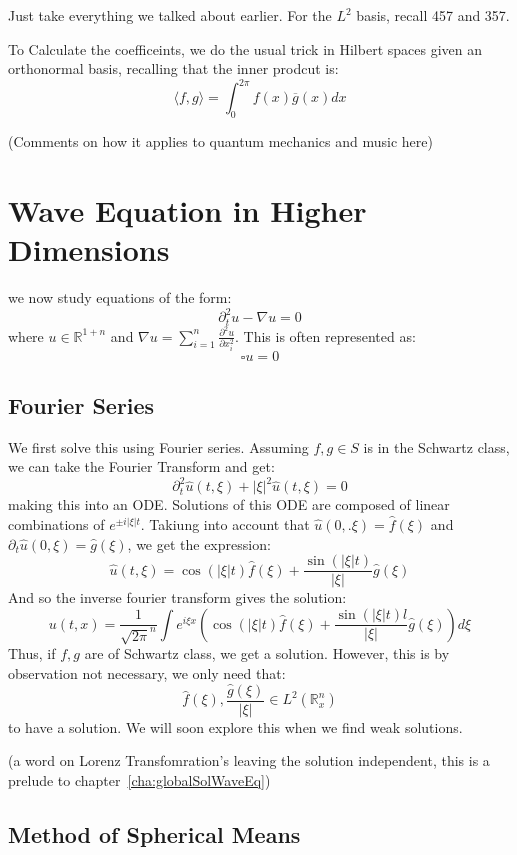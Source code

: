 \documentclass{book}
\newenvironment{Proof}[1][]
  {\begin{ProofTcb}[#1]}
  {\end{ProofTcb}}
\newcommand{\R}{{\mathbb{R}}}
\newcommand{\oln}[1]{{\overline{#1}}}
\begin{document}
\begin{Proof}
	Just take everything we talked about earlier. For the $L^2$ basis, recall 457 and 357.
\end{Proof}

To Calculate the coefficeints, we do the usual trick in Hilbert spaces given an orthonormal basis, recalling that the
inner prodcut is:
\[
	\langle f,g\rangle = \int_{0}^{2\pi} f(x) \oln{g}(x)dx
\]

(Comments on how it applies to quantum mechanics and music here)

\section{Wave Equation in Higher Dimensions}

we now study equations of the form:
\[
	 \partial_t^2 u - \nabla u = 0
\]
where $u \in \R^{1+n}$ and $\nabla u = \sum_{i=1}^n \frac{\partial^2 u}{\partial x_i^2}$. This is often represented as:
\[
	\square u = 0
\]
\subsection{Fourier Series}


We first solve this using Fourier series. Assuming $f,g \in S$ is in the Schwartz class, we can take the Fourier
Transform and get:
\[
	\partial_t^2 \hat{u}(t, \xi) + |\xi|^2\hat{u}(t, \xi) = 0
\]
making this into an ODE. Solutions of this ODE are composed of linear combinations of $e^{\pm i |\xi| t}$. Takiung into
account that $\hat{u}(0,. \xi) = \hat{f}(\xi)$ and $\partial_t \hat{u}(0, \xi) = \hat{g}(\xi)$, we get the expression:
\[
	\hat{u}(t, \xi) = \cos(|\xi|t) \hat{f}(\xi) + \frac{\sin(|\xi|t)}{|\xi|}\hat{g}(\xi)
\]
And so the inverse fourier transform gives the solution:
\[
	u(t,x) = \frac{1}{\sqrt{2\pi}^n} \int e^{i\xi x} \left(\cos(|\xi|t) \hat{f}(\xi)
		+ \frac{\sin(|\xi|t)l}{|\xi|}\hat{g}(\xi)\right)d\xi
\]
Thus, if $f,g$ are of Schwartz class, we get a solution. However, this is by observation not necessary, we only need
that:
\[
	\hat{f} (\xi), \frac{\hat{g}(\xi)}{|\xi|} \in L^2(\R_x^n)
\]
to have a solution. We will soon explore this when we find weak solutions.


(a word on Lorenz Transfomration's leaving the solution independent, this is a prelude to chapter~\ref{cha:globalSolWaveEq})

\subsection{Method of Spherical Means}
\end{document}
